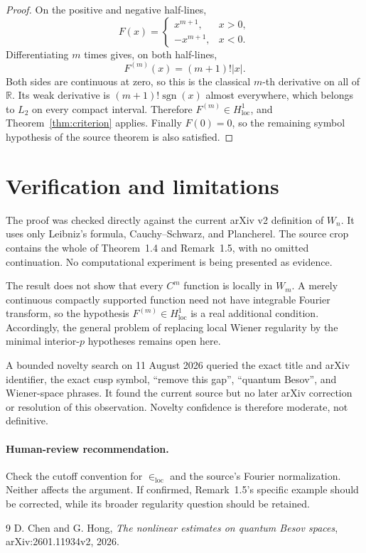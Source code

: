 \documentclass[11pt]{article}
\newcommand{\R}{\mathbb R}
\begin{document}
\begin{proof}
On the positive and negative half-lines,
\[
 F(x)=\begin{cases}x^{m+1},&x>0,\\-x^{m+1},&x<0.\end{cases}
\]
Differentiating $m$ times gives, on both half-lines,
\[
                F^{(m)}(x)=(m+1)!|x|.
\]
Both sides are continuous at zero, so this is the classical $m$-th derivative
on all of $\R$. Its weak derivative is $(m+1)!\operatorname{sgn}(x)$ almost
everywhere, which belongs to $L_2$ on every compact interval. Therefore
$F^{(m)}\in H^1_{\mathrm{loc}}$, and Theorem~\ref{thm:criterion} applies.
Finally $F(0)=0$, so the remaining symbol hypothesis of the source theorem is
also satisfied.
\end{proof}

\section{Verification and limitations}

The proof was checked directly against the current arXiv v2 definition of
$W_n$. It uses only Leibniz's formula, Cauchy--Schwarz, and Plancherel. The
source crop contains the whole of Theorem~1.4 and Remark~1.5, with no omitted
continuation. No computational experiment is being presented as evidence.

The result does not show that every $C^m$ function is locally in $W_m$.
A merely continuous compactly supported function need not have integrable
Fourier transform, so the hypothesis $F^{(m)}\in H^1_{\mathrm{loc}}$ is a real
additional condition. Accordingly, the general problem of replacing local
Wiener regularity by the minimal interior-$p$ hypotheses remains open here.

A bounded novelty search on 11 August 2026 queried the exact title and arXiv
identifier, the exact cusp symbol, ``remove this gap'', ``quantum Besov'', and
Wiener-space phrases. It found the current source but no later arXiv correction
or resolution of this observation. Novelty confidence is therefore moderate,
not definitive.

\paragraph{Human-review recommendation.}
Check the cutoff convention for $\in_{\mathrm{loc}}$ and the source's Fourier
normalization. Neither affects the argument. If confirmed, Remark~1.5's
specific example should be corrected, while its broader regularity question
should be retained.

\begin{thebibliography}{9}
D. Chen and G. Hong,
\emph{The nonlinear estimates on quantum Besov spaces},
arXiv:2601.11934v2, 2026.
\end{thebibliography}
\end{document}
